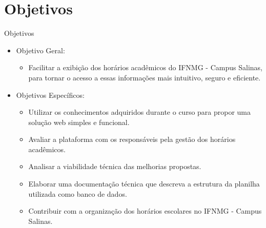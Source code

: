 \section{Objetivos}

\begin{frame}{Objetivos}
    \begin{itemize}
        \item Objetivo Geral: \vspace{0.1cm}
              \begin{itemize}
                  \item Facilitar a exibição dos horários acadêmicos do IFNMG - Campus Salinas, para tornar o acesso a essas informações mais intuitivo, seguro e eficiente. \vspace{0.1cm}
              \end{itemize}
        \item Objetivos Específicos: \vspace{0.1cm}
              \begin{itemize}
                  \item Utilizar os conhecimentos adquiridos durante o curso para propor uma solução web simples e funcional. \vspace{0.1cm}
                  \item Avaliar a plataforma com os responsáveis pela gestão dos horários acadêmicos. \vspace{0.1cm}
                  \item Analisar a viabilidade técnica das melhorias propostas. \vspace{0.1cm}
                  \item Elaborar uma documentação técnica que descreva a estrutura da planilha utilizada como banco de dados. \vspace{0.1cm}
                  \item Contribuir com a organização dos horários escolares no IFNMG - Campus Salinas. \vspace{0.1cm}
              \end{itemize}
    \end{itemize}
\end{frame}